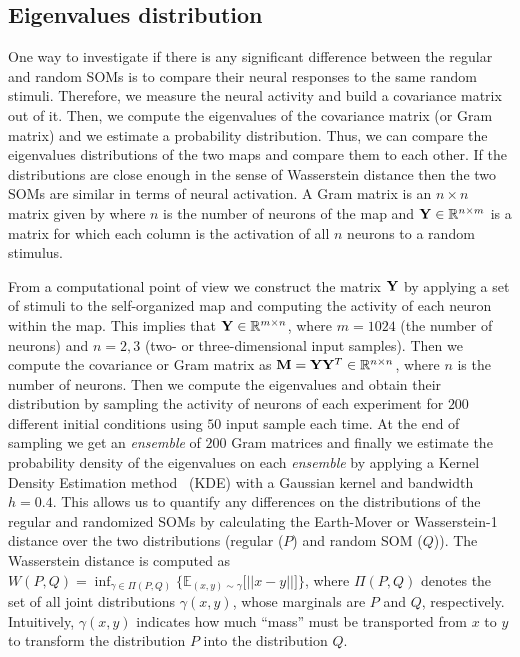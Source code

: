 \subsection{Eigenvalues distribution}
\label{sec:dist}

One way to investigate if there is any significant difference between the regular and random SOMs is to compare their neural responses to the same random stimuli. Therefore, we measure the neural activity and build a covariance matrix out of it. Then, we compute the eigenvalues of the covariance matrix (or Gram matrix) and we estimate a probability distribution. Thus, we can compare the eigenvalues distributions of the two maps and compare them to each other. If the distributions are close enough in the sense of Wasserstein distance then the two SOMs are similar in terms of neural activation.  A Gram matrix is an $n \times n$ matrix given by where $n$ is the number of neurons of the map and ${\bf Y} \in \mathbb{R}^{n \times m}$ is a matrix for which each column is the activation of all $n$ neurons to a random stimulus.

From a computational point of view we construct the matrix ${\bf Y}$ by applying a set of stimuli to the self-organized map and computing the activity of each neuron within the map. This implies that ${\bf Y} \in \mathbb{R}^{m \times n}$, where $m=1024$ (the number of neurons) and $n={2, 3}$ (two- or three-dimensional input samples). Then we compute the covariance or Gram matrix as ${\bf M} = {\bf Y}{\bf Y}^T \in \mathbb{R}^{n \times n}$, where $n$ is the number of neurons. Then we compute the eigenvalues and obtain their distribution by sampling the activity of neurons of each experiment for $200$ different initial conditions using $50$ input sample each time. At the end of sampling we get an \emph{ensemble} of $200$ Gram matrices and finally we estimate the probability density of the eigenvalues on each \emph{ensemble} by applying a Kernel Density Estimation method~\citep{Parzen:1962} (KDE) with a Gaussian kernel and bandwidth $h=0.4$. This allows us to quantify any differences on the distributions of the regular and randomized SOMs by calculating the Earth-Mover or Wasserstein-1 distance over the two distributions (regular ($P$) and random SOM ($Q$)). The Wasserstein distance is computed as $W(P, Q) = \inf_{\gamma \in \Pi(P, Q)}\{\mathbb{E}_{(x, y) \sim \gamma}\Big[||x - y||\Big]\}$, where $\Pi(P, Q)$ denotes the set of all joint distributions $\gamma (x, y)$, whose marginals are $P$ and $Q$, respectively. Intuitively, $\gamma (x,y)$ indicates  how  much ``mass'' must be transported from $x$ to $y$ to transform the distribution $P$ into the distribution $Q$. 

